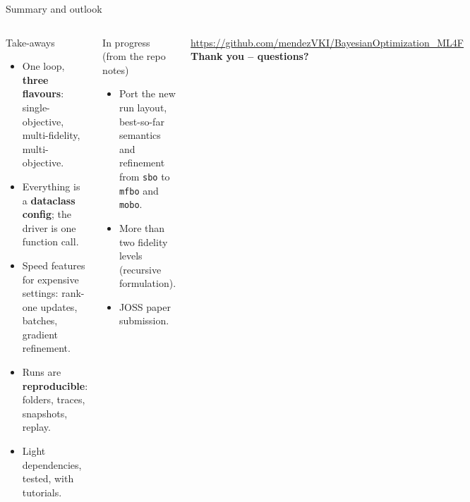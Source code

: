 \documentclass[aspectratio=169,10pt]{beamer}
\newcommand{\code}[1]{\texttt{#1}}
\begin{document}
\begin{frame}{Summary and outlook}
  \begin{columns}[T]
    \begin{block}{Take-aways}
      \begin{itemize}\small
        \item One loop, \textbf{three flavours}: single-objective, multi-fidelity, multi-objective.
        \item Everything is a \textbf{dataclass config}; the driver is one function call.
        \item Speed features for expensive settings: rank-one updates, batches, gradient refinement.
        \item Runs are \textbf{reproducible}: folders, traces, snapshots, replay.
        \item Light dependencies, tested, with tutorials.
      \end{itemize}
    \end{block}
    \begin{exampleblock}{In progress (from the repo notes)}
      \small
      \begin{itemize}
        \item Port the new run layout, best-so-far semantics and refinement from \code{sbo} to \code{mfbo} and \code{mobo}.
        \item More than two fidelity levels (recursive formulation).
        \item JOSS paper submission.
      \end{itemize}
    \end{exampleblock}
    \centering\small
    \medskip
    \url{https://github.com/mendezVKI/BayesianOptimization_ML4F}\\[1mm]
    \textbf{Thank you -- questions?}
  \end{columns}
\end{frame}
\end{document}
